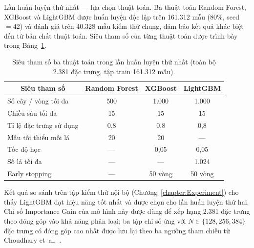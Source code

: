 \documentclass[../DoAn.tex]{subfiles}
\begin{document}
Lần huấn luyện thứ nhất — lựa chọn thuật toán.
Ba thuật toán Random Forest, XGBoost và LightGBM được huấn luyện
độc lập trên 161.312 mẫu (80\%, seed~$= 42$) và đánh giá trên
40.328 mẫu kiểm thử chung, đảm bảo kết quả khác biệt đến từ bản
chất thuật toán. Siêu tham số của từng thuật toán được trình bày
trong Bảng~\ref{tab:fullmodel-params}.
\begin{table}[H]
\centering
\caption{Siêu tham số ba thuật toán trong lần huấn luyện thứ
  nhất (toàn bộ 2.381 đặc trưng, tập train 161.312 mẫu).}
\label{tab:fullmodel-params}
\begin{tabular}{|l|c|c|c|}
\hline
\multicolumn{1}{|c|}{\textbf{Siêu tham số}} & \multicolumn{1}{c|}{\textbf{Random Forest}} & \multicolumn{1}{c|}{\textbf{XGBoost}} & \multicolumn{1}{c|}{\textbf{LightGBM}} \\
\hline
Số cây / vòng tối đa     & 500    & 1.000   & 1.000 \\
\hline
Chiều sâu tối đa         & 15     & 15      & 15 \\
\hline
Tỉ lệ đặc trưng sử dụng & 0{,}8  & 0{,}8   & 0{,}8 \\
\hline
Mẫu tối thiểu mỗi lá    & 20     & 20      & --- \\
\hline
Tốc độ học               & ---    & 0{,}05  & 0{,}05 \\
\hline
Số lá tối đa             & ---    & ---     & 1.024 \\
\hline
Early stopping           & ---    & 50 vòng & 50 vòng \\
\hline
\end{tabular}
\end{table}
Kết quả so sánh trên tập kiểm thử nội bộ
(Chương~\ref{chapter:Experiment}) cho thấy LightGBM đạt hiệu
năng tốt nhất và được chọn cho lần huấn luyện thứ hai. Chỉ số
Importance Gain của mô hình này được dùng để xếp hạng 2.381 đặc
trưng theo đóng góp vào khả năng phân loại; ba tập chỉ số ứng với
$N \in \{128, 256, 384\}$ đặc trưng có đóng góp cao nhất được lưu
lại theo ba ngưỡng tham chiếu từ Choudhary et~al.~\cite{choudhary2025}.
\end{document}
